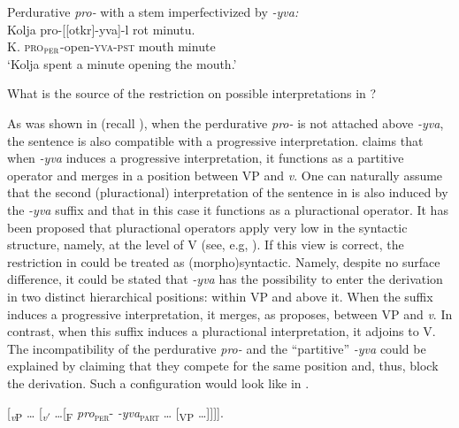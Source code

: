 \documentclass[output=paper,
]{langscibook}
\begin{document}
    \ea Perdurative \textit{pro-} with a stem imperfectivized by         \textit{-yva:}\label{ex:naumov:9}\smallskip\\
    \gll Kolja 	pro-[[otkr]-yva]-l 		rot 		minutu.\\  
     K. \textsc{pro}$_\textsc{per}$-open-\textsc{yva}-\textsc{pst} mouth 		minute\\ 
    \glt `Kolja spent a minute opening the mouth.'
\z\z 

\noindent What is the source of the restriction on possible interpretations in ?

As was shown in  (recall ), when the perdurative \textit{pro-} is not attached above  \textit{-yva}, the sentence is also compatible with a progressive interpretation. \citet{tatevosov2015severing} claims that when \textit{-yva} induces a progressive interpretation, it functions as a partitive operator and merges in a position between VP and \textit{v}. One can naturally assume that the second (pluractional) interpretation of the sentence in  is also induced by the \textit{-yva} suffix and that in this case it functions as a pluractional operator. It has been proposed that pluractional operators apply very low in the syntactic structure, namely, at the level of V (see, e.g, \citealt{lasersohn1995plurality,van2004adverbials}). If this view is correct, the restriction in  could be treated as (morpho)syntactic. Namely, despite no surface difference, it could be stated that \textit{-yva} has the possibility to enter the derivation in two distinct hierarchical positions: within VP and above it. When the suffix induces a progressive interpretation, it merges, as \citet{tatevosov2015severing} proposes, between VP and \textit{v}. In contrast, when this suffix induces a pluractional interpretation, it adjoins to V. The incompatibility of the perdurative \textit{pro-} and the ``partitive'' \textit{-yva} could be explained by claiming that they compete for the same position and, thus, block the derivation. Such a configuration would look like in . 

\ea \label{ex:naumov:10}
{[\textsubscript{\textit{v}P} {\ldots} [\textsubscript{\textit{v}$'$} \ldots [\textsubscript{F} \textit{pro}\textsubscript{\textsc{per}}- \textit{-yva}\textsubscript{\textsc{part}} {\ldots} [\textsubscript{VP} {\ldots}]]]].}
\z
\end{document}
